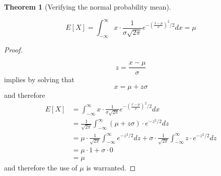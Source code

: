 \documentclass[10pt,]{book}
\theoremstyle{plain}
\newtheorem{theorem}{Theorem}[section]
\theoremstyle{definition}
\theoremstyle{definition}
\theoremstyle{definition}
\numberwithin{equation}{section}
\begin{document}
	
	
	
	
	
	\begin{theorem}[{Verifying the normal probability mean}]\label{theorem-57}

		\begin{equation*}E[X] = \int_{-\infty}^{\infty} x \cdot \frac{1}{\sigma \sqrt{2 \pi}} e^{ - \left ( \frac{x-\mu}{\sigma} \right ) ^2 / 2} dx = \mu\end{equation*}
\end{theorem}
\begin{proof}\hypertarget{proof-56}{}

	\begin{equation*}z = \frac{x-\mu}{\sigma}\end{equation*}
	implies by solving that
	\begin{equation*} x = \mu + z \sigma\end{equation*}
	and therefore
\begin{align*}
E[X] &= \int_{-\infty}^{\infty} x \cdot \frac{1}{\sigma \sqrt{2 \pi}} e^{ - \left ( \frac{x-\mu}{\sigma} \right ) ^2 / 2} dx \\
 &= \frac{1}{\sqrt{2 \pi}} \int_{-\infty}^{\infty} (\mu + z\sigma) \cdot e^{ -z^2 / 2} dz\\
 &= \mu \cdot \frac{1}{\sqrt{2 \pi}} \int_{-\infty}^{\infty} e^{ -z^2 / 2} dz + \sigma \cdot \frac{1}{\sqrt{2 \pi}} \int_{-\infty}^{\infty} z \cdot e^{ -z^2 / 2} dz\\
 &= \mu \cdot 1 + \sigma \cdot 0\\
 & = \mu
\end{align*}
	and therefore the use of \(\mu\) is warranted.
\end{proof}

	
	
	
	
\end{document}

